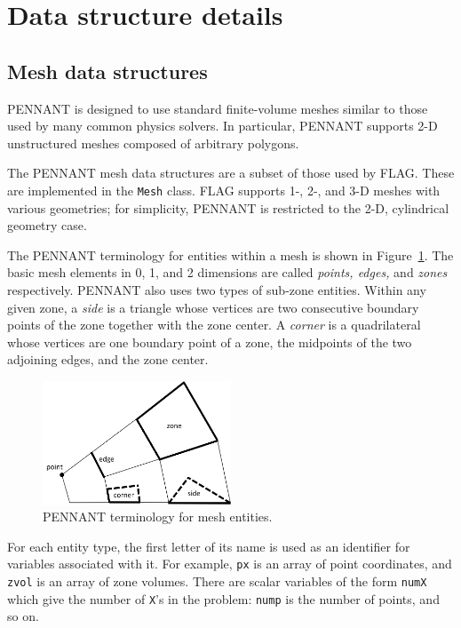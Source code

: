 \documentclass[11pt,letterpaper]{article}
\begin{document}
\section{Data structure details}

\subsection{Mesh data structures}

PENNANT is designed to use standard finite-volume meshes similar to
those used by many common physics solvers.  In particular, PENNANT
supports 2-D unstructured meshes composed of arbitrary polygons.

The PENNANT mesh data structures are a subset of those used by FLAG.
These are implemented in the {\tt Mesh} class.
FLAG supports 1-, 2-, and 3-D meshes with various geometries; for
simplicity, PENNANT is restricted to the 2-D, cylindrical geometry
case.

The PENNANT terminology for entities within a mesh is shown in
Figure~\ref{fig:mesh}.  The basic mesh elements in 0, 1, and 2 dimensions
are called {\em points, edges,} and {\em zones} respectively.
PENNANT also uses two types of sub-zone entities.  Within any given
zone, a {\em side} is a triangle whose vertices are two consecutive
boundary points of the zone together with the zone center.  A {\em corner}
is a quadrilateral whose vertices are one boundary point of a zone,
the midpoints of the two adjoining edges, and the zone center.

\begin{figure}
    \centering
    \includegraphics[width=0.50\textwidth]{mesh-entities.png}
    \caption{PENNANT terminology for mesh entities.}
    \label{fig:mesh}
\end{figure}

For each entity type, the first letter of its name is used as an
identifier for variables associated with it.  For example, {\tt px}
is an array of point coordinates, and {\tt zvol} is an array
of zone volumes.  There are scalar variables of the form
{\tt numX} which give the number of {\tt X}'s in the problem:
{\tt nump} is the number of points, and so on.
\end{document}
